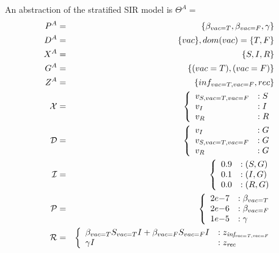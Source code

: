 \begin{example}\label{ex:abstraction}
	An abstraction of the stratified SIR model is $\Theta^A =$
	\begin{eqnarray*}
		P^A &=& \{\beta_{vac=T}, \beta_{vac=F}, \gamma\}\\
		D^A &=& \{vac\}, dom(vac) = \{T, F\}\\
		X^A &=& \{S, I, R\}\\
		G^A &=& \{(vac=T), (vac=F)\}\\
		Z^A &=& \{inf_{vac=T,vac=F}, rec\}\\
		{\cal X} &=& \left\{
		\begin{array}{ll}
			v_{S,vac=T, vac=F} & :S \\
			v_I                & :I \\
			v_R                & :R
		\end{array}\right.\\
		{\cal D} &=& \left\{
		\begin{array}{ll}
			v_I               & :G \\
			v_{S,vac=T,vac=F} & :G \\
			v_R               & :G \\
		\end{array}\right.\\
		{\cal I} &=& \left\{
		\begin{array}{ll}
			0.9 & :(S, G) \\
			0.1 & :(I, G) \\
			0.0 & :(R, G)
		\end{array}\right.\\
		{\cal P}&=& \left\{
		\begin{array}{ll}
			2e{-7} & :\beta_{vac=T} \\
			2e{-6} & :\beta_{vac=F} \\
			1e{-5} & :\gamma
		\end{array}\right.\\
		{\cal R} &=& \left\{
		\begin{array}{ll}
			\beta_{vac=T} S_{vac=T} I + \beta_{vac=F} S_{vac=F} I & : z_{\mathit{inf_{vac=T,vac=F}}} \\
			\gamma I                                              & : z_{\mathit{rec}}               \\
		\end{array}\right.\\
	\end{eqnarray*}
\end{example}

